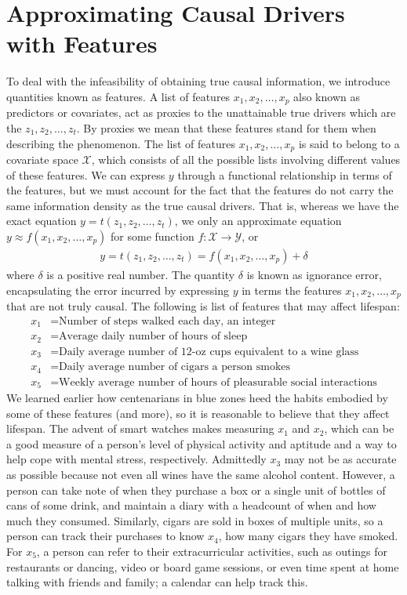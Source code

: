 \documentclass[12pt]{article}
\begin{document}
	\section{Approximating Causal Drivers with Features}
	
	To deal with the infeasibility of obtaining true causal information, we
	introduce quantities known as features. A list of features $x_1,x_2,\ldots,x_p$
	also known as predictors or covariates, act as proxies to the unattainable
	true drivers which are the $z_1,z_2,\ldots,z_t$. By proxies we mean that these
	features stand for them when describing the phenomenon. The list of
	features $x_1,x_2,\ldots,x_p$ is said to belong to a covariate space
	$\mathcal{X}$, which consists of all the possible lists involving different
	values of these features. We can express $y$ through a functional relationship
	in terms of the features, but we must account for the fact that the features
	do not carry the same information density as the true causal drivers.
	That is, whereas we have the exact equation $y=t(z_1,z_2,\ldots,z_t)$,
	we only an approximate equation $y\approx f(x_1,x_2,\ldots,x_p)$ for
	some function $f:\mathcal{X}\to\mathcal{Y}$, or
	\begin{align*}
		y = t(z_1,z_2,\ldots,z_t)=f(x_1,x_2,\ldots,x_p) + \delta
	\end{align*}
	where $\delta$ is a positive real number. The quantity $\delta$ is known as ignorance
	error, encapsulating the error incurred by expressing $y$ in terms the
	features $x_1,x_2,\ldots,x_p$ that are not truly causal. The following 
	is list of features that may affect lifespan:
	\begin{align*}
		x_1 &= \text{Number of steps walked each day, an integer}\\
		x_2 &= \text{Average daily number of hours of sleep}\\
		x_3 &= \text{Daily average number of 12-oz cups equivalent to a wine glass}\\
		x_4 &= \text{Daily average number of cigars a person smokes}\\
		x_5 &= \text{Weekly average number of hours of pleasurable social interactions}
	\end{align*}
	We learned earlier how centenarians in blue zones heed the habits embodied
	by some of these features (and more), so it is reasonable to believe that they affect
	lifespan. The advent of smart watches makes measuring $x_1$ and $x_2$, which can
	be a good measure of a person's level of physical activity and aptitude and
	a way to help cope with mental stress, respectively. Admittedly $x_3$
	may not be as accurate as possible because not even all wines have the same alcohol
	content. However, a person can take note of when they purchase a box or a single unit
	of bottles of cans of some drink, and maintain a diary with a headcount of when
	and how much they consumed. Similarly, cigars are sold in boxes of multiple units, so
	a person can track their purchases to know $x_4$, how many cigars they have smoked.
	For $x_5$, a person can refer to their extracurricular activities, such as
	outings for restaurants or dancing, video or board game sessions, or even
	time spent at home talking with friends and family; a calendar can help
	track this.
\end{document}
